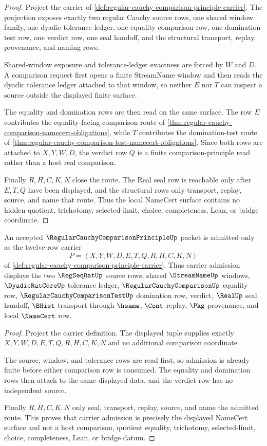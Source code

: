 \begin{proof}
Project the carrier of \autoref{def:regular-cauchy-comparison-principle-carrier}. The projection exposes exactly two regular Cauchy source rows, one shared window family, one dyadic tolerance ledger, one equality comparison row, one domination-test row, one verdict row, one seal handoff, and the structural transport, replay, provenance, and naming rows.

Shared-window exposure and tolerance-ledger exactness are forced by $W$ and $D$. A comparison request first opens a finite StreamName window and then reads the dyadic tolerance ledger attached to that window, so neither $E$ nor $T$ can inspect a source outside the displayed finite surface.

The equality and domination rows are then read on the same surface. The row $E$ contributes the equality-facing comparison route of \autoref{thm:regular-cauchy-comparison-namecert-obligations}, while $T$ contributes the domination-test route of \autoref{thm:regular-cauchy-comparison-test-namecert-obligations}. Since both rows are attached to $X,Y,W,D$, the verdict row $Q$ is a finite comparison-principle read rather than a host real comparison.

Finally $R,H,C,K,N$ close the route. The Real seal row is reachable only after $E,T,Q$ have been displayed, and the structural rows only transport, replay, source, and name that route. Thus the local NameCert surface contains no hidden quotient, trichotomy, selected-limit, choice, completeness, Lean, or bridge coordinate.
\end{proof}

\begin{theorem}
\label{thm:regular-cauchy-comparison-principle-carrier-admission}
An accepted $\RegularCauchyComparisonPrincipleUp$ packet is admitted only as the twelve-row carrier
$$
P=(X,Y,W,D,E,T,Q,R,H,C,K,N)
$$
of \autoref{def:regular-cauchy-comparison-principle-carrier}. Thus carrier admission displays the two $\RegSeqRatUp$ source rows, shared $\StreamNameUp$ windows, $\DyadicRatCoreUp$ tolerance ledger, $\RegularCauchyComparisonUp$ equality row, $\RegularCauchyComparisonTestUp$ domination row, verdict, $\RealUp$ seal handoff, $\BHist$ transport through $\hsame$, $\Cont$ replay, $\Pkg$ provenance, and local $\NameCert$ row.
\end{theorem}
\begin{proof}
Project the carrier definition. The displayed tuple supplies exactly $X,Y,W,D,E,T,Q,R,H,C,K,N$ and no additional comparison coordinate.

The source, window, and tolerance rows are read first, so admission is already finite before either comparison row is consumed. The equality and domination rows then attach to the same displayed data, and the verdict row has no independent source.

Finally $R,H,C,K,N$ only seal, transport, replay, source, and name the admitted route. This proves that carrier admission is precisely the displayed NameCert surface and not a host comparison, quotient equality, trichotomy, selected-limit, choice, completeness, Lean, or bridge datum.
\end{proof}

